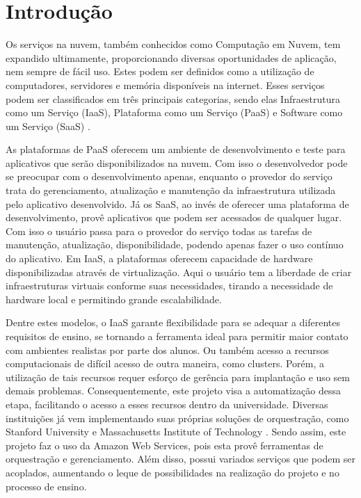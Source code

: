 \documentclass[tg]{mdtufsm}
\begin{document}
\tableofcontents
\listoffigures

\setlength{\baselineskip}{1.5\baselineskip}

\chapter{Introdução}

Os serviços na nuvem, também conhecidos como Computação em Nuvem, tem expandido ultimamente, proporcionando diversas oportunidades de aplicação, nem sempre de fácil uso. Estes podem ser definidos como a utilização de computadores, servidores e memória disponíveis na internet. Esses serviços podem ser classificados em três principais categorias, sendo elas Infraestrutura como um Serviço (IaaS), Plataforma como um Serviço (PaaS) e Software como um Serviço (SaaS) \cite{xaas2}.

As plataformas de PaaS oferecem um ambiente de desenvolvimento e teste para aplicativos que serão disponibilizados na nuvem. Com isso o desenvolvedor pode se preocupar com o desenvolvimento apenas, enquanto o provedor do serviço trata do gerenciamento, atualização e manutenção da infraestrutura utilizada pelo aplicativo desenvolvido. Já os SaaS, ao invés de oferecer uma plataforma de desenvolvimento, provê aplicativos que podem ser acessados de qualquer lugar. Com isso o usuário passa para o provedor do serviço todas as tarefas de manutenção, atualização, disponibilidade, podendo apenas fazer o uso contínuo do aplicativo. Em IaaS, a plataformas oferecem capacidade de hardware disponibilizadas através de virtualização. Aqui o usuário tem a liberdade de criar infraestruturas virtuais conforme suas necessidades, tirando a necessidade de hardware local e permitindo grande escalabilidade.

Dentre estes modelos, o IaaS garante flexibilidade para se adequar a diferentes requisitos de ensino, se tornando a ferramenta ideal para permitir maior contato com ambientes realistas por parte dos alunos. Ou também acesso a recursos computacionais de difícil acesso de outra maneira, como clusters. Porém, a utilização de tais recursos requer esforço de gerência para implantação e uso sem demais problemas. Consequentemente, este projeto visa a automatização dessa etapa, facilitando o acesso a esses recursos dentro da universidade. Diversas instituições já vem implementando suas próprias soluções de orquestração, como Stanford University e Massachusetts Institute of Technology \cite{stanford}. Sendo assim, este projeto faz o uso da Amazon Web Services, pois esta provê ferramentas de orquestração e gerenciamento. Além disso, possui variados serviços que podem ser acoplados, aumentando o leque de possibilidades na realização do projeto e no processo de ensino.
\end{document}
